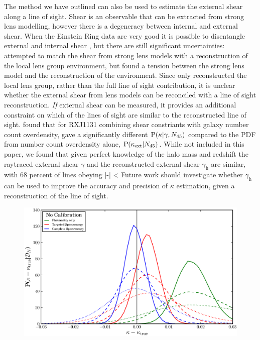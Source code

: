 \documentclass[useAMS,usenatbib]{mn2e}
\begin{document}
The method we have outlined can also be used to estimate the external shear
along a line of sight. Shear is an observable that can be extracted from
strong lens modelling, however there is a degeneracy between internal and
external shear. When the Einstein Ring data are very good it is possible to
disentangle external and internal shear \citep[\eg][]{xxx}, but there are
still significant uncertainties: \citet{WongEtal2011} attempted to match the
shear from strong lens models with a reconstruction of the local lens group
environment, but found a tension between the strong lens model and the
reconstruction of the environment. Since \citet{WongEtal2011} only
reconstructed the local lens group, rather than the full line of sight
contribution, it is unclear whether the external shear from lens models can be
reconciled with a line of sight reconstruction. {\it If} external shear can be
measured, it provides an additional constraint on which of the \MS lines of
sight are similar to the reconstructed line of sight. \citet{SuyuEtal2012}
found that for RXJ1131 combining shear constriants with galaxy number count
overdensity, gave a significantly different ${\rm P}(\kappa|\gamma,N_{45})$
compared to the PDF from number count overdensity alone,
${\rm P}(\kappa_{\rm ext}|N_{45})$. While not included in this paper, we found that given
perfect knowledge of the halo mass and redshift the raytraced external shear
$\gamma$ and the reconstructed external shear $\gamma_{\mathrm{h}}$  are
similar, with 68 percent of lines obeying
\be
\label{eq:shearineq}
|{\boldmath{\gamma}-}| < 
\ee 
Future work should investigate whether $\gamma_{\mathrm{h}}$ can be used
to improve the accuracy and precision of $\kappa$ estimation, given a
reconstruction of the line of sight. 

\begin{figure}
\includegraphics[width=\columnwidth]{figs/biasplots3.eps}
\caption{}
\label{fig:no-median-tricks}
\end{figure}
\end{document}
